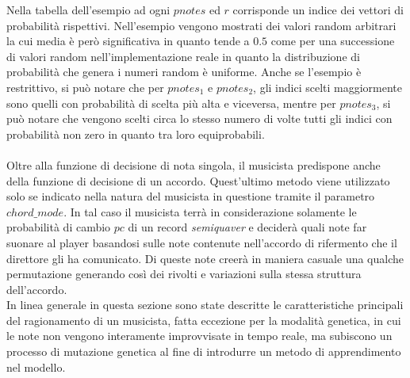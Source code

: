 Nella tabella dell'esempio ad ogni $pnotes$ ed $r$ corrisponde un indice
dei vettori di probabilità rispettivi. Nell'esempio vengono mostrati dei
valori random arbitrari la cui media è però significativa in quanto
tende a $0.5$ come per una successione di valori random nell'implementazione 
reale in quanto la distribuzione di probabilità che genera i numeri
random è uniforme. Anche se l'esempio è restrittivo, si può notare che
per $pnotes_1$ e $pnotes_2$, gli indici scelti maggiormente sono quelli 
con probabilità di scelta più alta e viceversa, mentre per $pnotes_3$, si 
può notare che vengono scelti circa lo stesso numero di volte 
tutti gli indici con probabilità non zero in quanto tra loro
equiprobabili.\\\\
Oltre alla funzione di decisione di nota singola, il musicista
predispone anche della funzione di decisione di un accordo. Quest'ultimo
metodo viene utilizzato solo se indicato nella natura del musicista in
questione tramite il parametro $chord\_mode$. In tal caso il musicista
terrà in considerazione solamente le probabilità di cambio $pc$ di un
record \emph{semiquaver} e deciderà quali note far suonare al player
basandosi sulle note contenute nell'accordo di rifermento che il direttore
gli ha comunicato. Di queste note creerà in maniera casuale una
qualche permutazione generando così dei rivolti e variazioni sulla
stessa struttura dell'accordo.\\
In linea generale in questa sezione sono state descritte le
caratteristiche principali del ragionamento di un musicista, fatta
eccezione per la modalità genetica, in cui le note non vengono
interamente improvvisate in tempo reale, ma subiscono un processo di 
mutazione genetica al fine di introdurre un metodo di apprendimento nel
modello. 
